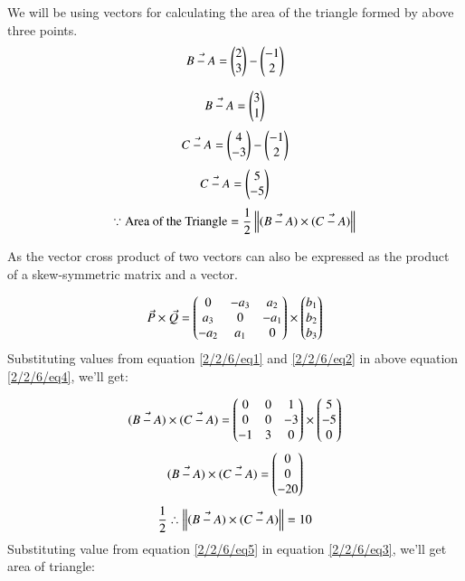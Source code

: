 We will be using vectors for calculating the area of the triangle formed by above three points.
%
\begin{align}
    \Vec{B-A} =\begin{pmatrix}
    2\\3
    \end{pmatrix} -\begin{pmatrix}
    -1\\2\end{pmatrix}
\end{align}
    
\begin{align} \label{2/2/6/eq1}
\Vec{B-A}= \begin{pmatrix}3\\1\end{pmatrix}
\end{align}
\begin{align}
\Vec{C-A} =\begin{pmatrix}
4\\-3
\end{pmatrix} -\begin{pmatrix}
-1\\2 \end{pmatrix}
\end{align}
\begin{align} \label{2/2/6/eq2}
\Vec{C-A}= \begin{pmatrix}5\\-5\end{pmatrix}
\end{align}
\begin{align} \label{2/2/6/eq3}
    \because
    \text{Area of the Triangle}  = \frac{1}{2}\left\lVert(\Vec{B-A})\times ( \Vec{C-A}) \right\rVert
\end{align}
\newline

As the vector cross product of two vectors can also be expressed as the product of a skew-symmetric matrix and a vector.

\begin{align} \label{2/2/6/eq4}
    \Vec{P}\times  \Vec{Q}  = 
    \begin{pmatrix}
    0&-a_{3}&a_{2}\\
    a_{3}&0&-a_{1}\\
    -a_{2}&a_{1}&0\\
    \end{pmatrix}
    \times \begin{pmatrix}
    b_{1}\\
    b_{2}\\
    b_{3}\\\end{pmatrix}
\end{align}
Substituting values from equation \eqref{2/2/6/eq1} and \eqref{2/2/6/eq2} in above equation \eqref{2/2/6/eq4}, we'll get:

\begin{align}
    \Vec{(B-A)}\times  \Vec{(C-A)}  = 
    \begin{pmatrix}
    0&0&1\\
    0&0&-3\\
   -1&3&0\\\end{pmatrix}
    \times \begin{pmatrix}
    5\\
    -5\\
    0\\\end{pmatrix}
\end{align}
\begin{align} \label{2/2/6/eq5}
    \Vec{(B-A)}\times  \Vec{(C-A)}  = \begin{pmatrix}
    0\\
    0\\
    -20\\\end{pmatrix}
\end{align}
\begin{align} \label{2/2/6/eq5}
\frac{1}{2}    \therefore \left\lVert\Vec{(B-A)}\times  \Vec{(C-A)} \right\rVert  = 10
\end{align}
Substituting value from equation \eqref{2/2/6/eq5} in equation \eqref{2/2/6/eq3}, we'll get area of triangle:

